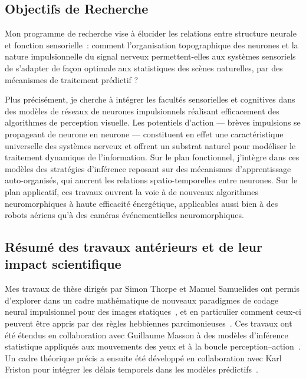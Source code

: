 \documentclass[10pt,french,a4paper,oneside]{article}%
\newcommand{\BioSketch}{Laurent Perrinet est chercheur en neurosciences computationnelles au CNRS, directeur de recherche à l'Institut de Neurosciences de la Timone à Marseille. Il s'intéresse à une question fondamentale~: comment notre cerveau parvient-il à construire une image cohérente du monde à partir d'informations visuelles fragmentées et incertaines ? Sur le plan expérimental, il développe des protocoles associant stimulations paramétrables et enregistrements neurophysiologiques pour caractériser les mécanismes de traitement prédictif dans le cortex visuel primaire, notamment le rôle des connexions récurrentes dans la robustesse au bruit sensoriel~\citep{Ladret23}. Sur le plan théorique, il formalise la représentation de l'information visuelle sous forme de motifs spatio-temporels d'impulsions neuronales, une approche fondée sur la notion de polychronie et dont les premières applications neuromorphiques ont démontré des gains énergétiques de plusieurs centaines de fois par rapport aux méthodes analogiques classiques~\citep{Grimaldi23BC}. Ces travaux nourrissent la conception d'algorithmes bio-inspirés à haute efficacité énergétique, applicables à des systèmes embarqués comme les robots aériens ou les caméras événementielles.}
\begin{document}

\subsection*{Objectifs de Recherche}

Mon programme de recherche vise à élucider les relations entre structure neurale et fonction sensorielle~: comment l'organisation topographique des neurones et la nature impulsionnelle du signal nerveux permettent-elles aux systèmes sensoriels de s'adapter de façon optimale aux statistiques des scènes naturelles, par des mécanismes de traitement prédictif ?

Plus précisément, je cherche à intégrer les facultés sensorielles et cognitives dans des modèles de réseaux de neurones impulsionnels réalisant efficacement des algorithmes de perception visuelle. Les potentiels d'action --- brèves impulsions se propageant de neurone en neurone --- constituent en effet une caractéristique universelle des systèmes nerveux et offrent un substrat naturel pour modéliser le traitement dynamique de l'information. Sur le plan fonctionnel, j'intègre dans ces modèles des stratégies d'inférence reposant sur des mécanismes d'apprentissage auto-organisés, qui ancrent les relations spatio-temporelles entre neurones. Sur le plan applicatif, ces travaux ouvrent la voie à de nouveaux algorithmes neuromorphiques à haute efficacité énergétique, applicables aussi bien à des robots aériens qu'à des caméras événementielles neuromorphiques.

\subsection*{Résumé des travaux antérieurs et de leur impact scientifique}

Mes travaux de thèse dirigés par Simon Thorpe et Manuel Samuelides ont permis d'explorer dans un cadre mathématique de nouveaux paradigmes de codage neural impulsionnel pour des images statiques~\citep{Perrinet03ieee}, et en particulier comment ceux-ci peuvent être appris par des règles hebbiennes parcimonieuses~\citep{Perrinet10shl}. Ces travaux ont été étendus en collaboration avec Guillaume Masson à des modèles d'inférence statistique appliqués aux mouvements des yeux et à la boucle perception--action~\citep{Simoncini12}. Un cadre théorique précis a ensuite été développé en collaboration avec Karl Friston pour intégrer les délais temporels dans les modèles prédictifs~\citep{PerrinetAdamsFriston14}.
\end{document}
